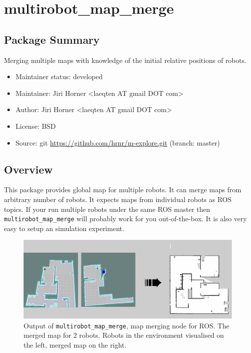 \chapter{multirobot\_map\_merge}
\label{chap:map_merge-doc}

\section{Package Summary}

Merging multiple maps with knowledge of the initial relative positions of robots.

\begin{itemize}
    \item Maintainer status: developed
    \item Maintainer: Jiri Horner \textless laeqten AT gmail DOT com\textgreater
    \item Author: Jiri Horner \textless laeqten AT gmail DOT com\textgreater
    \item License: BSD
    \item Source: git \url{https://github.com/hrnr/m-explore.git} (branch: master)
\end{itemize}

\section{Overview}

This package provides global map for multiple robots. It can merge maps from arbitrary number of robots. It expects maps from individual robots as ROS topics. If your run multiple robots under the same ROS master then \texttt{multirobot\_map\_merge} will probably work for you out-of-the-box. It is also very easy to setup an simulation experiment.

\begin{figure}
    \centering
    \includegraphics[width=4.53in]{../img/map_merge_cover.png}
    \caption[The merged map for $2$ robots.]{Output of \texttt{multirobot\_map\_merge}, map merging node for \gls{ROS}. The merged map for $2$ robots. Robots in the environment visualised on the left, merged map on the right.}
    \label{fig:mapmergecover}
\end{figure}

